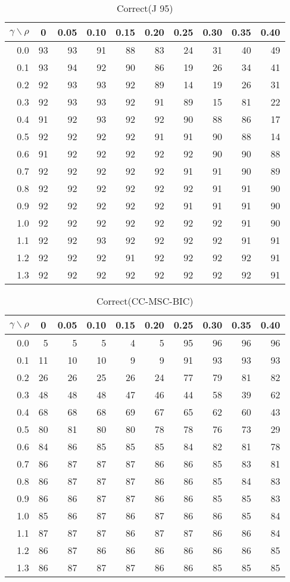 \documentclass[12pt]{article}
\begin{document}
%
\begin{table}[!tbp]
\caption{Correct(J 95)}
 \begin{center}
 \begin{tabular}{r|rrrrrrrrr}\hline\hline
\multicolumn{1}{c|}{$\gamma\backslash\rho$}&\multicolumn{1}{c}{0}&\multicolumn{1}{c}{0.05}&\multicolumn{1}{c}{0.10}&\multicolumn{1}{c}{0.15}&\multicolumn{1}{c}{0.20}&\multicolumn{1}{c}{0.25}&\multicolumn{1}{c}{0.30}&\multicolumn{1}{c}{0.35}&\multicolumn{1}{c}{0.40}\tabularnewline
\hline
0.0&93&93&91&88&83&24&31&40&49\tabularnewline
0.1&93&94&92&90&86&19&26&34&41\tabularnewline
0.2&92&93&93&92&89&14&19&26&31\tabularnewline
0.3&92&93&93&92&91&89&15&81&22\tabularnewline
0.4&91&92&93&92&92&90&88&86&17\tabularnewline
0.5&92&92&92&92&91&91&90&88&14\tabularnewline
0.6&91&92&92&92&92&92&90&90&88\tabularnewline
0.7&92&92&92&92&92&91&91&90&89\tabularnewline
0.8&92&92&92&92&92&92&91&91&90\tabularnewline
0.9&92&92&92&92&92&91&91&91&90\tabularnewline
1.0&92&92&92&92&92&92&92&91&90\tabularnewline
1.1&92&92&93&92&92&92&92&91&91\tabularnewline
1.2&92&92&92&91&92&92&92&92&91\tabularnewline
1.3&92&92&92&92&92&92&92&92&91\tabularnewline
\hline
\end{tabular}

\end{center}

\end{table}

%
\begin{table}[!tbp]
\caption{Correct(CC-MSC-BIC)}
 \begin{center}
 \begin{tabular}{r|rrrrrrrrr}\hline\hline
\multicolumn{1}{c|}{$\gamma\backslash\rho$}&\multicolumn{1}{c}{0}&\multicolumn{1}{c}{0.05}&\multicolumn{1}{c}{0.10}&\multicolumn{1}{c}{0.15}&\multicolumn{1}{c}{0.20}&\multicolumn{1}{c}{0.25}&\multicolumn{1}{c}{0.30}&\multicolumn{1}{c}{0.35}&\multicolumn{1}{c}{0.40}\tabularnewline
\hline
0.0& 5& 5& 5& 4& 5&95&96&96&96\tabularnewline
0.1&11&10&10& 9& 9&91&93&93&93\tabularnewline
0.2&26&26&25&26&24&77&79&81&82\tabularnewline
0.3&48&48&48&47&46&44&58&39&62\tabularnewline
0.4&68&68&68&69&67&65&62&60&43\tabularnewline
0.5&80&81&80&80&78&78&76&73&29\tabularnewline
0.6&84&86&85&85&85&84&82&81&78\tabularnewline
0.7&86&87&87&87&86&86&85&83&81\tabularnewline
0.8&86&87&87&87&86&86&85&84&83\tabularnewline
0.9&86&86&87&87&86&86&85&85&83\tabularnewline
1.0&85&86&87&86&87&86&86&85&84\tabularnewline
1.1&87&87&87&86&87&87&86&86&84\tabularnewline
1.2&86&87&86&86&86&86&86&86&85\tabularnewline
1.3&86&87&87&87&86&86&85&85&85\tabularnewline
\hline
\end{tabular}

\end{center}

\end{table}
\end{document}
